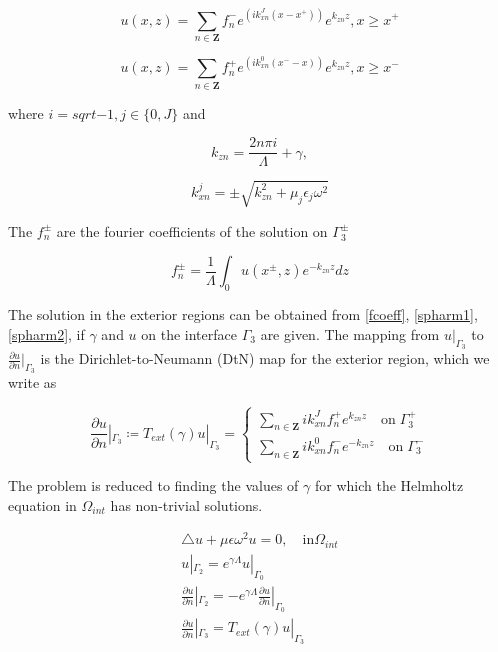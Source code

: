 \begin{equation}
u(x,z) = \sum_{n \in \mathbf{Z}} f_n^- e^{(ik_{xn}^J(x -
x^+))} e^{k_{zn}z}, x \geq x^+
\label{spharm1}
\end{equation}

\begin{equation}
u(x,z) = \sum_{n \in \mathbf{Z}} f_n^+ e^{(ik_{xn}^0(x^- -
x))} e^{k_{zn}z}, x \geq x^-
\label{spharm2}
\end{equation}

where $i = sqrt{-1}, j \in \lbrace 0,J \rbrace$ and

\begin{equation} k_{zn} = \frac{2 n \pi i}{\Lambda} + \gamma,
\end{equation}

\begin{equation} k_{xn}^j = \pm \sqrt{k_{zn}^2 + \mu_j \epsilon_j
\omega^2}
\end{equation}

The $f_n^\pm$ are the fourier coefficients of the solution on
$\Gamma_3^\pm$

\begin{equation}
f_n^\pm = \frac{1}{\Lambda}\int_0 u(x^\pm,z) e^{-k_{zn} z} dz
\label{fcoeff}
\end{equation}

The solution in the exterior regions can be obtained from
\ref{fcoeff}, \ref{spharm1}, \ref{spharm2}, if $\gamma$ and $u$ on the
interface $\Gamma_3$ are given. The mapping from $u|_{\Gamma_3}$ to
$\frac{\partial u}{\partial n} |_{\Gamma_3}$ is the
Dirichlet-to-Neumann (DtN) map for the exterior region, which we write
as

\begin{equation}
\frac{\partial u}{\partial n} |_{\Gamma_3} \coloneqq T_{ext}(\gamma)
u|_{\Gamma_3} = \left \{ \begin{array}{ll} \sum_{n \in \mathbf{Z}} i
k_{xn}^J f_n^+ e^{k_{zn}z} \quad \textrm{on} \; \Gamma_3^+ \\
\sum_{n \in \mathbf{Z}} ik_{xn}^0 f_n^- e^{-k_{zn}z} \quad
\textrm{on}\; \Gamma_3^- \end{array}\right .
\end{equation}

The problem is reduced to finding the values of $\gamma$ for which the
Helmholtz equation in $\Omega_{int}$ has non-trivial solutions.

\begin{equation}
\begin{array}{ll}
\triangle u + \mu \epsilon \omega^2 u = 0, \quad \textrm{in}
\Omega_{int} \\
u|_{\Gamma_2} = e^{\gamma \Lambda} u|_{\Gamma_0} \\
\frac{\partial u}{\partial n} |_{\Gamma_2} = -e^{\gamma \Lambda}
 \frac{\partial u}{\partial n} |_{\Gamma_0} \\
\frac{\partial u}{\partial n} |_{\Gamma_3} =  T_{ext}(\gamma) u|_{\Gamma_3}
\end{array}
\end{equation} 

